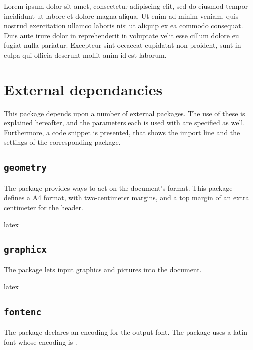 \documentclass{report}
\begin{document}
\begin{imtaQuote}
Lorem ipsum dolor sit amet, consectetur adipiscing elit, sed do eiusmod tempor incididunt ut labore et dolore magna aliqua. 
Ut enim ad minim veniam, quis nostrud exercitation ullamco laboris nisi ut aliquip ex ea commodo consequat. 
Duis aute irure dolor in reprehenderit in voluptate velit esse cillum dolore eu fugiat nulla pariatur.
Excepteur sint occaecat cupidatat non proident, sunt in culpa qui officia deserunt mollit anim id est laborum.
\end{imtaQuote}



\section{External dependancies}
This package depends upon a number of external packages.
The use of these is explained hereafter, and the parameters each is used with are specified as well.
Furthermore, a code snippet is presented, that shows the import line and the settings of the corresponding package.


\subsection{\texttt{geometry}}
The  package provides ways to act on the document's format.
This package defines a A4 format, with two-centimeter margins, and a top margin of an extra centimeter for the header.

\begin{imtaCode}{latex}
\RequirePackage[a4paper, margin=2cm, top=3cm]{geometry}
\end{imtaCode}


\subsection{\texttt{graphicx}}
The  package lets input graphics and pictures into the document.

\begin{imtaCode}{latex}
\RequirePackage{graphicx}
\end{imtaCode}


\subsection{\texttt{fontenc}}
The  package declares an encoding for the output font.
The  package uses a latin font whose encoding is .
\end{document}
